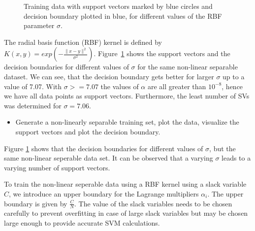 \documentclass[a4]{article}
\begin{document}
\begin{figure}[h!]
	\caption{Training data with support vectors marked by blue circles and decision boundary plotted in blue, for different values of the RBF parameter $\sigma$.}
	\label{fig:sv_kernel}
\end{figure}
The radial basis function (RBF) kernel is defined by $K(x,y) = exp(-\frac{\|x-y\|^2}{\sigma^2})$.
Figure~\ref{fig:sv_kernel} shows the support vectors and the decision boundaries for different values of $\sigma$ for the same non-linear separable dataset. We can see, that the decision boundary gets better for larger $\sigma$ up to a value of 7.07. With $\sigma>=7.07$ the values of $\alpha$ are all greater than $10^{-8}$, hence we have all data points as support vectors. Furthermore, the least number of SVs was determined for $\sigma=7.06$.

\begin{itemize}
\item Generate a non-linearly separable training set, plot the data, visualize the support vectors and plot the decision boundary.
\end{itemize}
Figure \ref{fig:sv_kernel} shows that the decision boundaries for different values of $\sigma$, but the same non-linear seperable data set. It can be observed that a varying $\sigma$ leads to a varying number of support vectors.


To train the non-linear seperable data using a RBF kernel using a slack variable $C$, we introduce an upper boundary for the Lagrange multipliers $\alpha _i$. The upper boundary is given by $\frac{C}{N}$. The value of the slack variables needs to be chosen carefully to prevent overfitting in case of large slack variables but may be chosen large enough to provide accurate SVM calculations.

% 
% 
\end{document}
